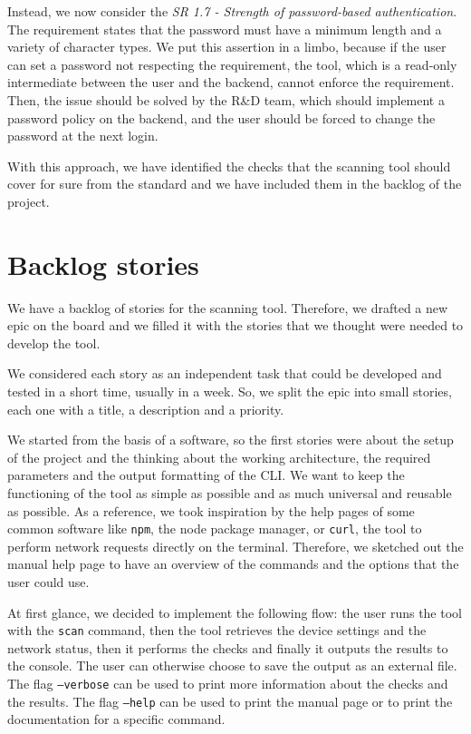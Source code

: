 Instead, we now consider the \textit{SR 1.7 - Strength of password-based authentication}. The requirement states that the password must have a minimum length and a variety of character types. We put this assertion in a limbo, because if the user can set a password not respecting the requirement, the tool, which is a read-only intermediate between the user and the backend, cannot enforce the requirement. Then, the issue should be solved by the R\&D team, which should implement a password policy on the backend, and the user should be forced to change the password at the next login.

With this approach, we have identified the checks that the scanning tool should cover for sure from the standard and we have included them in the backlog of the project.

\section{Backlog stories}

We have a backlog of stories for the scanning tool. Therefore, we drafted a new epic on the board and we filled it with the stories that we thought were needed to develop the tool.

We considered each story as an independent task that could be developed and tested in a short time, usually in a week. So, we split the epic into small stories, each one with a title, a description and a priority.

We started from the basis of a software, so the first stories were about the setup of the project and the thinking about the working architecture, the required parameters and the output formatting of the CLI. We want to keep the functioning of the tool as simple as possible and as much universal and reusable as possible. As a reference, we took inspiration by the help pages of some common software like \texttt{npm}, the node package manager, or \texttt{curl}, the tool to perform network requests directly on the terminal. Therefore, we sketched out the manual help page to have an overview of the commands and the options that the user could use.

At first glance, we decided to implement the following flow: the user runs the tool with the \texttt{scan} command, then the tool retrieves the device settings and the network status, then it performs the checks and finally it outputs the results to the console. The user can otherwise choose to save the output as an external file. The flag \texttt{--verbose} can be used to print more information about the checks and the results. The flag \texttt{--help} can be used to print the manual page or to print the documentation for a specific command.

